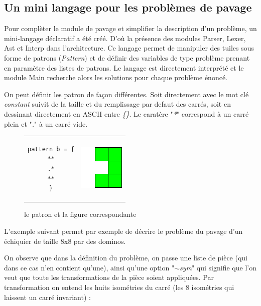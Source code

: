 \documentclass[a4paper]{article}
\begin{document}
\subsection{Un mini langage pour les problèmes de pavage}
Pour complèter le module de pavage et simplifier la description d'un problème, 
un mini-langage déclaratif a été créé. D'où la présence des
modules Parser, Lexer, Ast et Interp dans l'architecture. 
Ce langage permet de manipuler des tuiles sous forme de patrons (\emph{Pattern})
et de définir des variables de type problème prenant en paramètre des listes de 
patrons. Le langage est directement interprété et le module Main recherche 
alors les solutions pour chaque problème énoncé. 

On peut définir les patron de façon différentes. Soit directement avec le mot
clé \emph{constant} suivit de la taille et du remplissage par defaut des carrés,
soit en dessinant directement en ASCII entre 
\emph{\{\}}. Le caratère "\emph{*}" correspond à un carré plein et "\emph{.}" à
un carré vide.

\begin{figure}[h]
\centering
\begin{tabular}{c c}
\begin{lstlisting}
pattern b = {
**
.*
**
}
\end{lstlisting}&
\includegraphics[scale=1]{../imports/patron.pdf}
\end{tabular}
\caption{le patron et la figure correspondante}
\label{fig:myfirsttable}
\end{figure}

L'exemple suivant permet par exemple de décrire le problème du pavage d'un 
échiquier de taille 8x8 par des dominos.



On observe que dans la définition du problème, on passe une liste de pièce (qui
dans ce cas n'en contient qu'une), ainsi qu'une option "\emph{$\sim$sym}" qui 
signifie que l'on veut que toute les transformations de la pièce soient 
appliquées.
Par transformation on entend les huits isométries du carré (les 8 isométries
qui laissent un carré invariant) : 
\end{document}
